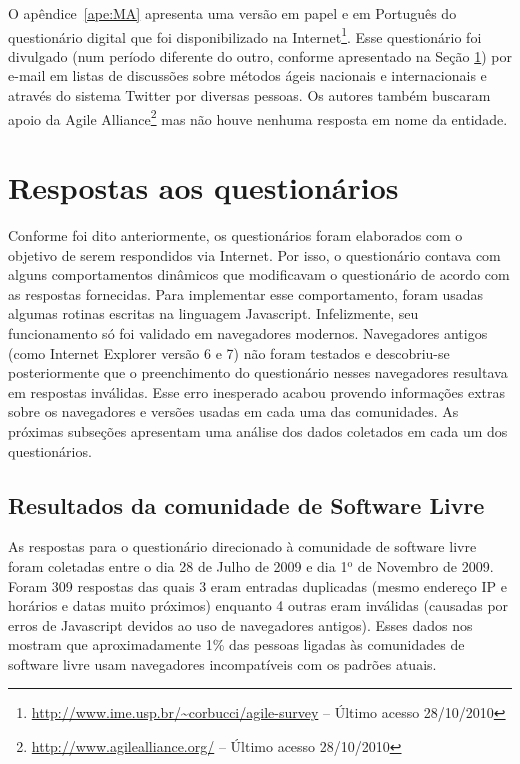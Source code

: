 O apêndice~\ref{ape:MA} apresenta uma versão em papel e em Português
do questionário digital que foi disponibilizado na
Internet\footnote{\url{http://www.ime.usp.br/~corbucci/agile-survey}
  -- Último acesso 28/10/2010}. Esse questionário foi divulgado (num
período diferente do outro, conforme apresentado na Seção
\ref{sec:respostas}) por e-mail em listas de discussões sobre métodos
ágeis nacionais e internacionais e através do sistema Twitter por
diversas pessoas. Os autores também buscaram apoio da Agile
Alliance\footnote{\url{http://www.agilealliance.org/} -- Último acesso
  28/10/2010} mas não houve nenhuma resposta em nome da entidade.

\section{Respostas aos questionários}
\label{sec:respostas}

Conforme foi dito anteriormente, os questionários foram elaborados com
o objetivo de serem respondidos via Internet. Por isso, o questionário
contava com alguns comportamentos dinâmicos que modificavam o
questionário de acordo com as respostas fornecidas. Para implementar
esse comportamento, foram usadas algumas rotinas escritas na linguagem
Javascript. Infelizmente, seu funcionamento só foi validado em
navegadores modernos. Navegadores antigos (como Internet Explorer
versão 6 e 7) não foram testados e descobriu-se posteriormente que o
preenchimento do questionário nesses navegadores resultava em
respostas inválidas. Esse erro inesperado acabou provendo informações
extras sobre os navegadores e versões usadas em cada uma das
comunidades. As próximas subseções apresentam uma análise dos dados
coletados em cada um dos questionários.

\subsection{Resultados da comunidade de Software Livre}
\label{sec:resp-floss}

As respostas para o questionário direcionado à comunidade de software
livre foram coletadas entre o dia 28 de Julho de 2009 e dia
1$^\textrm{o}$ de Novembro de 2009. Foram 309 respostas das quais 3
eram entradas duplicadas (mesmo endereço IP e horários e datas muito
próximos) enquanto 4 outras eram inválidas (causadas por erros de
Javascript devidos ao uso de navegadores antigos). Esses dados nos
mostram que aproximadamente 1\% das pessoas ligadas às comunidades de
software livre usam navegadores incompatíveis com os padrões atuais.

